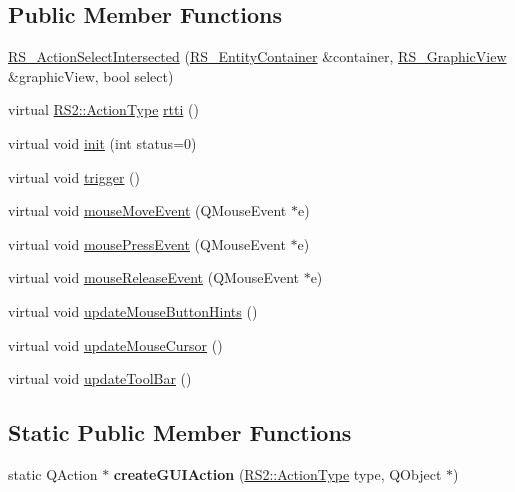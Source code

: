 \subsection*{Public Member Functions}
\begin{DoxyCompactItemize}
\item 
\hyperlink{classRS__ActionSelectIntersected_a157a4224e900e55d2ac2efacae84418f}{R\-S\-\_\-\-Action\-Select\-Intersected} (\hyperlink{classRS__EntityContainer}{R\-S\-\_\-\-Entity\-Container} \&container, \hyperlink{classRS__GraphicView}{R\-S\-\_\-\-Graphic\-View} \&graphic\-View, bool select)
\item 
virtual \hyperlink{classRS2_afe3523e0bc41fd637b892321cfc4b9d7}{R\-S2\-::\-Action\-Type} \hyperlink{classRS__ActionSelectIntersected_a22470ae5377df7238f9fdd192fe42774}{rtti} ()
\item 
virtual void \hyperlink{classRS__ActionSelectIntersected_abfd5a39babce8a502147de943557a57e}{init} (int status=0)
\item 
virtual void \hyperlink{classRS__ActionSelectIntersected_acaa95ed81f3b885ba2f23f1965dd1faa}{trigger} ()
\item 
virtual void \hyperlink{classRS__ActionSelectIntersected_a5eefde3138e6cc999ae81f07daf7c89a}{mouse\-Move\-Event} (Q\-Mouse\-Event $\ast$e)
\item 
virtual void \hyperlink{classRS__ActionSelectIntersected_af4b124611d0a3148de2899f200d3206a}{mouse\-Press\-Event} (Q\-Mouse\-Event $\ast$e)
\item 
virtual void \hyperlink{classRS__ActionSelectIntersected_a9b417143dac579e53c24bf859fe29d9e}{mouse\-Release\-Event} (Q\-Mouse\-Event $\ast$e)
\item 
virtual void \hyperlink{classRS__ActionSelectIntersected_a521371778f1ea385eda8419b4b1dcede}{update\-Mouse\-Button\-Hints} ()
\item 
virtual void \hyperlink{classRS__ActionSelectIntersected_a8236385fe83fbcb1191962a341e4727a}{update\-Mouse\-Cursor} ()
\item 
virtual void \hyperlink{classRS__ActionSelectIntersected_a80657d7502972c8b3573478b0035760a}{update\-Tool\-Bar} ()
\end{DoxyCompactItemize}
\subsection*{Static Public Member Functions}
\begin{DoxyCompactItemize}
\item 
\hypertarget{classRS__ActionSelectIntersected_ab186c297f3b85c2958198af8485b31f3}{static Q\-Action $\ast$ {\bfseries create\-G\-U\-I\-Action} (\hyperlink{classRS2_afe3523e0bc41fd637b892321cfc4b9d7}{R\-S2\-::\-Action\-Type} type, Q\-Object $\ast$)}\label{classRS__ActionSelectIntersected_ab186c297f3b85c2958198af8485b31f3}

\end{DoxyCompactItemize}
